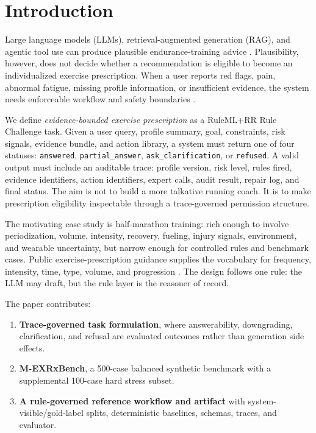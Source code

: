 \documentclass{ceurart}
\begin{document}
\section{Introduction}

Large language models (LLMs), retrieval-augmented generation (RAG), and agentic tool use can produce plausible endurance-training advice \cite{lewis2020rag,asai2024selfrag,yao2023react,schick2023toolformer}. Plausibility, however, does not decide whether a recommendation is eligible to become an individualized exercise prescription. When a user reports red flags, pain, abnormal fatigue, missing profile information, or insufficient evidence, the system needs enforceable workflow and safety boundaries \cite{sutton2020cdss}.

We define \emph{evidence-bounded exercise prescription} as a RuleML+RR Rule Challenge task. Given a user query, profile summary, goal, constraints, risk signals, evidence bundle, and action library, a system must return one of four statuses: \texttt{answered}, \texttt{partial\_answer}, \texttt{ask\_clarification}, or \texttt{refused}. A valid output must include an auditable trace: profile version, risk level, rules fired, evidence identifiers, action identifiers, expert calls, audit result, repair log, and final status. The aim is not to build a more talkative running coach. It is to make prescription eligibility inspectable through a trace-governed permission structure.

The motivating case study is half-marathon training: rich enough to involve periodization, volume, intensity, recovery, fueling, injury signals, environment, and wearable uncertainty, but narrow enough for controlled rules and benchmark cases. Public exercise-prescription guidance supplies the vocabulary for frequency, intensity, time, type, volume, and progression \cite{garber2011exercise,acsm2021guidelines,who2020physicalactivity}. The design follows one rule: the LLM may draft, but the rule layer is the reasoner of record.

The paper contributes:

\begin{enumerate}
  \item \textbf{Trace-governed task formulation}, where answerability, downgrading, clarification, and refusal are evaluated outcomes rather than generation side effects.
  \item \textbf{M-EXRxBench}, a 500-case balanced synthetic benchmark with a supplemental 100-case hard stress subset.
  \item \textbf{A rule-governed reference workflow and artifact} with system-visible/gold-label splits, deterministic baselines, schemas, traces, and evaluator.
\end{enumerate}
\end{document}
